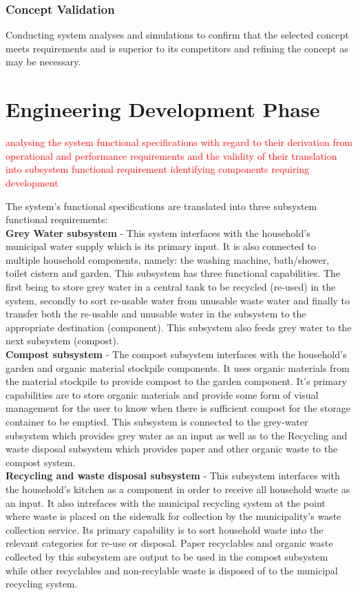 \documentclass[a4paper,11pt,fleqn]{report}
\begin{document}
\subsection{Concept Validation}
Conducting system analyses and simulations to confirm that the selected concept meets requirements and is superior to its competitors and refining the concept as may be necessary. 

\chapter{Engineering Development Phase}
\textcolor{red}{analysing the system functional specifications with regard to their derivation from operational and performance requirements and the validity of their translation into subsystem functional requirement identifying components requiring development}

The system's functional specifications are translated into three subsystem functional requirements:\\

\textbf{Grey Water subsystem} - This system interfaces with the household's municipal water supply which is its primary input. It is also connected to multiple household components, namely: the washing machine, bath/shower, toilet cistern and garden. This subsystem has three functional capabilities. The first being to store grey water in a central tank to be recycled (re-used) in the system, secondly to sort re-usable water from unusable waste water and finally to transfer both the re-usable and unusable water in the subsystem to the appropriate destination (component). This subsystem also feeds grey water to the next subsystem (compost).\\

\textbf{Compost subsystem} -  The compost subsystem interfaces with the household's garden and organic material stockpile components. It uses organic materials from the material stockpile to provide compost to the garden component. It's primary capabilities are to store organic materials and provide some form of visual management for the user to know when there is sufficient compost for the storage container to be emptied. This subsystem is connected to the grey-water subsystem which provides grey water as an input as well as to the Recycling and waste disposal subsystem which provides paper and other organic waste to the compost system.\\

\textbf{Recycling and waste disposal subsystem} - This subsystem interfaces with the household's kitchen as a component in order to receive all household waste as an input. It also intrefaces with the municipal recycling system at the point where waste is placed on the sidewalk for collection by the municipality's waste collection service. Its primary capability is to sort household waste into the relevant categories for re-use or disposal. Paper recyclables and organic waste collected by this subsystem are output to be used in the compost subsystem while other recyclables and non-recylable waste is disposed of to the municipal recycling system.
\end{document}
